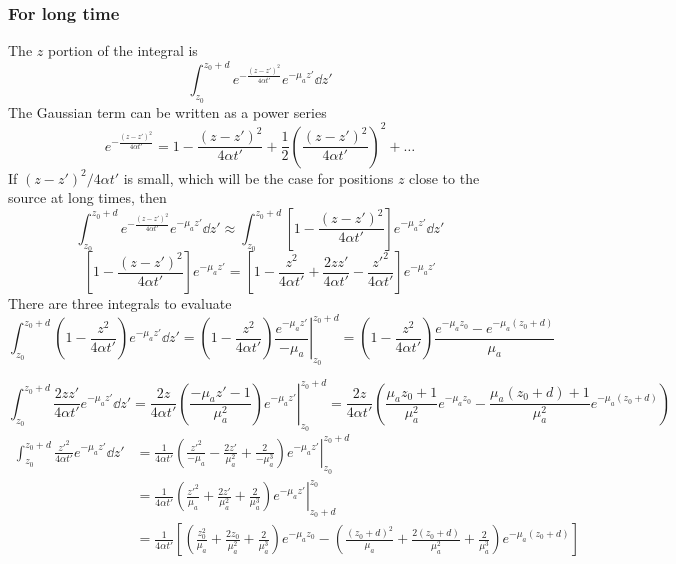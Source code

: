 \documentclass[]{article}
\begin{document}
\subsubsection{For long time}

The $z$ portion of the integral is
\begin{equation*}
    \int_{z_0}^{z_0 + d} e^{-\frac{(z-z')^2}{4\alpha t'}} e^{-\mu_a z'} \dd z'
\end{equation*}
The Gaussian term can be written as a power series
\begin{equation*}
  e^{-\frac{(z-z')^2}{4\alpha t'}} = 1 - \frac{(z-z')^2}{4\alpha t'} + \frac{1}{2}\left(\frac{(z-z')^2}{4\alpha t'}\right)^2 + \ldots
\end{equation*}
If $(z-z')^2/4\alpha t'$ is small, which will be the case for positions $z$ close
to the source at long times, then
\begin{equation*}
    \int_{z_0}^{z_0 + d} e^{-\frac{(z-z')^2}{4\alpha t'}} e^{-\mu_a z'} \dd z' \approx
    \int_{z_0}^{z_0 + d} \left[1 - \frac{(z-z')^2}{4\alpha t'}\right] e^{-\mu_a z'} \dd z'
\end{equation*}
\begin{equation*}
    \left[1 - \frac{(z-z')^2}{4\alpha t'}\right] e^{-\mu_a z'}
=   \left[1 - \frac{z^2}{4\alpha t'} + \frac{2zz'}{4\alpha t'} -\frac{z'^2}{4\alpha t'}\right] e^{-\mu_a z'}
\end{equation*}
There are three integrals to evaluate
\begin{equation*}
    \int_{z_0}^{z_0 + d}
   \left(1 -  \frac{z^2}{4\alpha t'}\right)e^{-\mu_a z'}
    \dd z' =
    \left.\left(1 -  \frac{z^2}{4\alpha t'}\right)\frac{e^{-\mu_a z'}}{-\mu_a} \right|_{z_0}^{z_0 + d}
    = \left(1 -  \frac{z^2}{4\alpha t'}\right)\frac{e^{-\mu_a z_0} - e^{-\mu_a (z_0+d)}}{\mu_a}
\end{equation*}

\begin{equation*}
    \int_{z_0}^{z_0 + d}
   \frac{2zz'}{4\alpha t'} e^{-\mu_a z'}
   \dd z'
   = \left.\frac{2z}{4\alpha t'} \left(\frac{-\mu_az' - 1}{\mu_a^2} \right)e^{-\mu_a z'} \right|_{z_0}^{z_0 + d}
     = \frac{2z}{4\alpha t'} \left( \frac{\mu_a z_0 + 1}{\mu_a^2}e^{-\mu_a z_0} - \frac{\mu_a (z_0+d) + 1}{\mu_a^2}e^{-\mu_a (z_0+d)}\right)
\end{equation*}
\begin{align*}
    \int_{z_0}^{z_0 + d}
   \frac{z'^2}{4\alpha t'} e^{-\mu_a z'}
   \dd z'
   &= \left.\frac{1}{4\alpha t'} \left( \frac{z'^2}{-\mu_a} - \frac{2z'}{\mu_a^2} + \frac{2}{-\mu_a^3} \right)e^{-\mu_a z'} \right|_{z_0}^{z_0 + d} \\
   &= \left.\frac{1}{4\alpha t'} \left( \frac{z'^2}{\mu_a} + \frac{2z'}{\mu_a^2} + \frac{2}{\mu_a^3} \right)e^{-\mu_a z'} \right|_{z_0 + d}^{z_0} \\
   &=
   \frac{1}{4\alpha t'}\left[
   \left( \frac{z_0^2}{\mu_a} + \frac{2z_0}{\mu_a^2} + \frac{2}{\mu_a^3} \right)e^{-\mu_a z_0} -
   \left( \frac{(z_0 + d)^2}{\mu_a} + \frac{2(z_0 + d)}{\mu_a^2} + \frac{2}{\mu_a^3} \right)e^{-\mu_a (z_0+d)}
   \right]
\end{align*}
\end{document}
